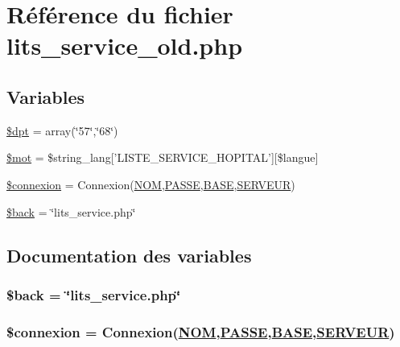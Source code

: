 \hypertarget{lits__service__old_8php}{
\section{R\'{e}f\'{e}rence du fichier lits\_\-service\_\-old.php}
\label{lits__service__old_8php}
}
\subsection*{Variables}
\begin{CompactItemize}
\item 
\hyperlink{lits__service__old_8php_a0}{\$dpt} = array(\char`\"{}57\char`\"{},\char`\"{}68\char`\"{})
\item 
\hyperlink{lits__service__old_8php_a1}{\$mot} = \$string\_\-lang\mbox{[}'LISTE\_\-SERVICE\_\-HOPITAL'\mbox{]}\mbox{[}\$langue\mbox{]}
\item 
\hyperlink{lits__service__old_8php_a2}{\$connexion} = Connexion(\hyperlink{pma__connect_8php_a0}{NOM},\hyperlink{pma__connect_8php_a1}{PASSE},\hyperlink{pma__connect_8php_a3}{BASE},\hyperlink{pma__connect_8php_a2}{SERVEUR})
\item 
\hyperlink{lits__service__old_8php_a3}{\$back} = \char`\"{}lits\_\-service.php\char`\"{}
\end{CompactItemize}


\subsection{Documentation des variables}
\hypertarget{lits__service__old_8php_a3}{
\subsubsection[\$back]{\setlength{\rightskip}{0pt plus 5cm}\$back = \char`\"{}lits\_\-service.php\char`\"{}}}
\label{lits__service__old_8php_a3}


\hypertarget{lits__service__old_8php_a2}{
\subsubsection[\$connexion]{\setlength{\rightskip}{0pt plus 5cm}\$connexion = Connexion(\hyperlink{pma__connect_8php_a0}{NOM},\hyperlink{pma__connect_8php_a1}{PASSE},\hyperlink{pma__connect_8php_a3}{BASE},\hyperlink{pma__connect_8php_a2}{SERVEUR})}}
\label{lits__service__old_8php_a2}


